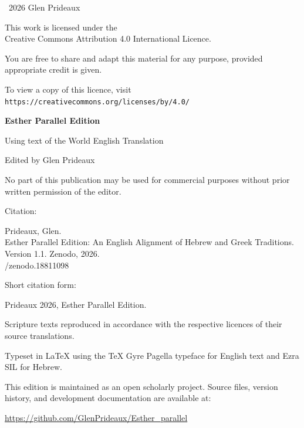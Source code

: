 \clearpage
\thispagestyle{empty}
\vspace*{\fill}

\small
\textcopyright\ 2026 Glen Prideaux

\vspace{1em}

This work is licensed under the\\
Creative Commons Attribution 4.0 International Licence.

\vspace{1em}

You are free to share and adapt this material for any purpose,
provided appropriate credit is given.

\vspace{1em}

To view a copy of this licence, visit\\
\texttt{https://creativecommons.org/licenses/by/4.0/}

\vspace{2em}

\textbf{Esther Parallel Edition}

Using text of the World English Translation

\vspace{1em}

Edited by Glen Prideaux

\vspace{2em}

No part of this publication may be used for commercial purposes
without prior written permission of the editor.

\vspace{2em}

{
\setlength{\parindent}{1cm}%
\noindent Citation:\par
\indent Prideaux, Glen.\\
\indent Esther Parallel Edition: An English Alignment of Hebrew
and Greek Traditions.\\
\indent Version 1.1. Zenodo, 2026.\\
/zenodo.18811098

\noindent Short citation form:\par
\indent Prideaux 2026, Esther Parallel Edition.
}

\vspace{2em}

Scripture texts reproduced in accordance with the respective licences
of their source translations.

\vspace{2em}

Typeset in \LaTeX{} using the \TeX{} Gyre Pagella typeface for English
text and Ezra SIL for Hebrew.

This edition is maintained as an open scholarly project.
Source files, version history, and development documentation are available at:

\href{https://github.com/GlenPrideaux/Esther\_parallel}{https://github.com/GlenPrideaux/Esther\_parallel}


